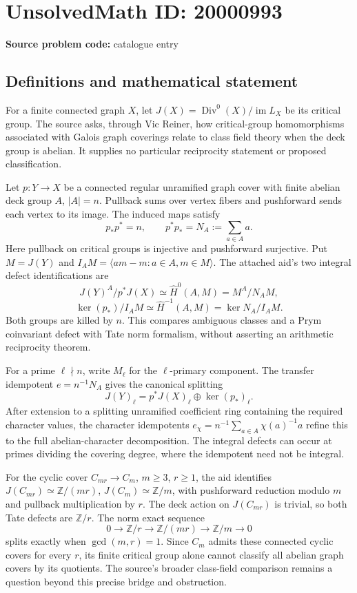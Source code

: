 \documentclass[11pt]{article}
\newcommand{\Z}{\mathbb{Z}}
\begin{document}
\section*{UnsolvedMath ID: 20000993}
\textbf{Source problem code:} catalogue entry
\subsection{Definitions and mathematical statement}
For a finite connected graph $X$, let $J(X)=\operatorname{Div}^0(X)/\operatorname{im}L_X$ be its critical group. The source asks, through Vic Reiner, how critical-group homomorphisms associated with Galois graph coverings relate to class field theory when the deck group is abelian. It supplies no particular reciprocity statement or proposed classification.

Let $p:Y\to X$ be a connected regular unramified graph cover with finite abelian deck group $A$, $|A|=n$. Pullback sums over vertex fibers and pushforward sends each vertex to its image. The induced maps satisfy
\[
p_*p^*=n,\qquad p^*p_*=N_A:=\sum_{a\in A}a.
\]
Here pullback on critical groups is injective and pushforward surjective. Put $M=J(Y)$ and $I_AM=\langle am-m:a\in A,m\in M\rangle$. The attached aid's two integral defect identifications are
\[
J(Y)^A/p^*J(X)\simeq\widehat H^0(A,M)=M^A/N_AM,
\]
\[
\ker(p_*)/I_AM\simeq\widehat H^{-1}(A,M)=\ker N_A/I_AM.
\]
Both groups are killed by $n$. This compares ambiguous classes and a Prym coinvariant defect with Tate norm formalism, without asserting an arithmetic reciprocity theorem.

For a prime $\ell\nmid n$, write $M_\ell$ for the $\ell$-primary component. The transfer idempotent $e=n^{-1}N_A$ gives the canonical splitting
\[
J(Y)_\ell=p^*J(X)_\ell\oplus\ker(p_*)_\ell.
\]
After extension to a splitting unramified coefficient ring containing the required character values, the character idempotents $e_\chi=n^{-1}\sum_{a\in A}\chi(a)^{-1}a$ refine this to the full abelian-character decomposition. The integral defects can occur at primes dividing the covering degree, where the idempotent need not be integral.

For the cyclic cover $C_{mr}\to C_m$, $m\ge3$, $r\ge1$, the aid identifies $J(C_{mr})\simeq\Z/(mr)$, $J(C_m)\simeq\Z/m$, with pushforward reduction modulo $m$ and pullback multiplication by $r$. The deck action on $J(C_{mr})$ is trivial, so both Tate defects are $\Z/r$. The norm exact sequence
\[
0\longrightarrow\Z/r\longrightarrow\Z/(mr)\longrightarrow\Z/m\longrightarrow0
\]
splits exactly when $\gcd(m,r)=1$. Since $C_m$ admits these connected cyclic covers for every $r$, its finite critical group alone cannot classify all abelian graph covers by its quotients. The source's broader class-field comparison remains a question beyond this precise bridge and obstruction.
\end{document}
